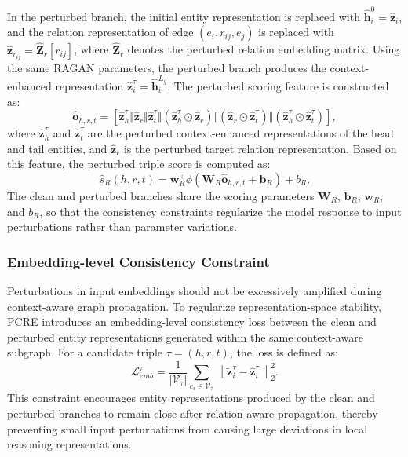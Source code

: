 \documentclass[a4paper,fleqn]{cas-sc}
\begin{document}
In the perturbed branch, the initial entity representation is replaced with $\widehat{\mathbf{h}}_{i}^{0}=\widehat{\mathbf{z}}_{i}$, and the relation representation of edge $(e_i,r_{ij},e_j)$ is replaced with $\widehat{\mathbf{z}}_{r_{ij}}=\widehat{\mathbf{Z}}_{r}[r_{ij}]$, where $\widehat{\mathbf{Z}}_{r}$ denotes the perturbed relation embedding matrix. Using the same RAGAN parameters, the perturbed branch produces the context-enhanced representation $\widehat{\mathbf{z}}_{i}^{\tau}=\widehat{\mathbf{h}}_{i}^{L_g}$. The perturbed scoring feature is constructed as:
\begin{equation}
\widehat{\mathbf{o}}_{h,r,t}
=
\left[
\widehat{\mathbf{z}}_{h}^{\tau}
\Vert
\widehat{\mathbf{z}}_{r}
\Vert
\widehat{\mathbf{z}}_{t}^{\tau}
\Vert
\left(
\widehat{\mathbf{z}}_{h}^{\tau}
\odot
\widehat{\mathbf{z}}_{r}
\right)
\Vert
\left(
\widehat{\mathbf{z}}_{r}
\odot
\widehat{\mathbf{z}}_{t}^{\tau}
\right)
\Vert
\left(
\widehat{\mathbf{z}}_{h}^{\tau}
\odot
\widehat{\mathbf{z}}_{t}^{\tau}
\right)
\right],
\end{equation}
where $\widehat{\mathbf{z}}_{h}^{\tau}$ and $\widehat{\mathbf{z}}_{t}^{\tau}$ are the perturbed context-enhanced representations of the head and tail entities, and $\widehat{\mathbf{z}}_{r}$ is the perturbed target relation representation. Based on this feature, the perturbed triple score is computed as:
\begin{equation}
\widehat{s}_R(h,r,t)
=
\mathbf{w}_{R}^{\top}
\phi
\left(
\mathbf{W}_{R}
\widehat{\mathbf{o}}_{h,r,t}
+
\mathbf{b}_{R}
\right)
+
b_{R}.
\end{equation}
The clean and perturbed branches share the scoring parameters $\mathbf{W}_{R}$, $\mathbf{b}_{R}$, $\mathbf{w}_{R}$, and $b_{R}$, so that the consistency constraints regularize the model response to input perturbations rather than parameter variations.

\subsubsection{Embedding-level Consistency Constraint}

Perturbations in input embeddings should not be excessively amplified during context-aware graph propagation. To regularize representation-space stability, PCRE introduces an embedding-level consistency loss between the clean and perturbed entity representations generated within the same context-aware subgraph. For a candidate triple $\tau=(h,r,t)$, the loss is defined as:
\begin{equation}
\mathcal{L}_{emb}^{\tau}
=
\frac{1}{|\mathcal{V}_{\tau}|}
\sum_{e_i\in\mathcal{V}_{\tau}}
\left\|
\widetilde{\mathbf{z}}_{i}^{\tau}
-
\widehat{\mathbf{z}}_{i}^{\tau}
\right\|_{2}^{2}.
\end{equation}
This constraint encourages entity representations produced by the clean and perturbed branches to remain close after relation-aware propagation, thereby preventing small input perturbations from causing large deviations in local reasoning representations.
\end{document}
